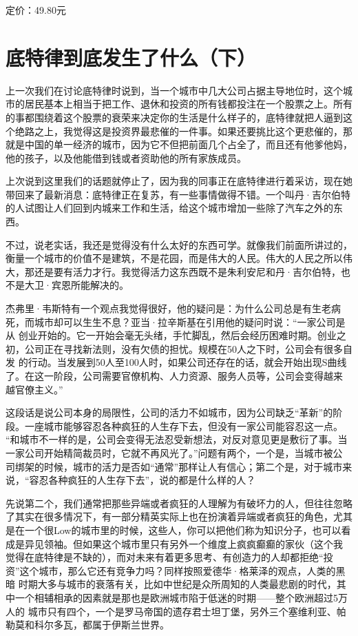 定价：49.80元

\hypertarget{ux5e95ux7279ux5f8bux5230ux5e95ux53d1ux751fux4e86ux4ec0ux4e48ux4e0b}{%
\section{底特律到底发生了什么（下）}\label{ux5e95ux7279ux5f8bux5230ux5e95ux53d1ux751fux4e86ux4ec0ux4e48ux4e0b}}

上一次我们在讨论底特律时说到，当一个城市中几大公司占据主导地位时，这个城市的居民基本上相当于把工作、退休和投资的所有钱都投注在一个股票之上。所有
的事都围绕着这个股票的衰荣来决定你的生活是什么样子的，底特律就把人逼到这个绝路之上，我觉得这是投资界最悲催的一件事。如果还要挑比这个更悲催的，那
就是中国的单一经济的城市，因为它不但把前面几个占全了，而且还有他爹他妈，他的孩子，以及他能借到钱或者资助他的所有家族成员。

上次说到这里我们的话题就停止了，因为我的同事正在底特律进行着采访，现在她带回来了最新消息：底特律正在复苏，有一些事情做得不错。一个叫丹·吉尔伯特的人试图让人们回到内城来工作和生活，给这个城市增加一些除了汽车之外的东西。

不过，说老实话，我还是觉得没有什么太好的东西可学。就像我们前面所讲过的，衡量一个城市的价值不是建筑，不是花园，而是伟大的人民。伟大的人民之所以伟大，那还是要有活力才行。我觉得活力这东西既不是朱利安尼和丹·吉尔伯特，也不是大卫·宾恩所能解决的。

杰弗里·韦斯特有一个观点我觉得很好，他的疑问是：为什么公司总是有生老病死，而城市却可以生生不息？亚当·拉辛斯基在引用他的疑问时说：``一家公司是从
创业开始的。它一开始会毫无头绪，手忙脚乱，然后会经历困难时期。创业之初，公司正在寻找新法则，没有欠债的担忧。规模在50人之下时，公司会有很多自发
的行动。当发展到50人至100人时，如果公司还存在的话，就会开始出现S曲线了。在这一阶段，公司需要官僚机构、人力资源、服务人员等，公司会变得越来
越官僚主义。''

这段话是说公司本身的局限性，公司的活力不如城市，因为公司缺乏``革新''的阶段。一座城市能够容忍各种疯狂的人生存下去，但没有一家公司能容忍这一点。
``和城市不一样的是，公司会变得无法忍受新想法，对反对意见更是敷衍了事。当一家公司开始精简裁员时，它就不再风光了。''问题有两个，一个是，当城市被公
司绑架的时候，城市的活力是否如``通常''那样让人有信心；第二个是，对于城市来说，``容忍各种疯狂的人生存下去''，说的都是什么样的人？

先说第二个，我们通常把那些异端或者疯狂的人理解为有破坏力的人，但往往忽略了其实在很多情况下，有一部分精英实际上也在扮演着异端或者疯狂的角色，尤其
是在一个很Low的城市里的时候，这些人，你可以把他们称为知识分子，也可以看成是异见领袖。但如果这个城市里只有另外一个维度上疯疯癫癫的家伙（这个我
觉得在底特律是不缺的），而对未来有着更多思考、有创造力的人却都拒绝``投资''这个城市，那么它还有竞争力吗？同样按照爱德华·格莱泽的观点，人类的黑暗
时期大多与城市的衰落有关，比如中世纪是众所周知的人类最悲剧的时代，其中一个相辅相承的因素就是那也是欧洲城市陷于低迷的时期------整个欧洲超过5万人的
城市只有四个，一个是罗马帝国的遗存君士坦丁堡，另外三个塞维利亚、帕勒莫和科尔多瓦，都属于伊斯兰世界。

